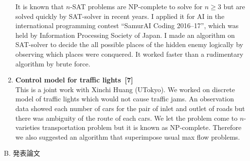 \begin{enumerate}
  It is known that $n$-SAT problems are NP-complete
  to solve for $n \geq 3$
  but are solved quickly by SAT-solver in recent years.
  I applied it for AI in the international
  programming contest ``SamurAI Coding
  2016--17'', which was held by Information
  Processing Society of Japan. I made an algorithm on SAT-solver
  to decide the all possible places of the hidden enemy logically
  by observing which places were conquered.
  It worked faster than a rudimentary algorithm by brute force.
  \item {\bf Control model for traffic lights~[7]} \\
  This is a joint work with Xinchi Huang (UTokyo).
  We worked on discrete model of traffic lights which would not
  cause traffic jams.
  An observation data showed each number of cars for the pair of
  inlet and outlet of roads but there was ambiguity of
  the route of each cars.
  We let the problem come to
  $n$-varieties transportation problem but it is known as
  NP-complete. Therefore we also suggested an algorithm
  that superimpose usual max flow problems.
\end{enumerate}


\vspace{0.2cm}


\noindent
B. 発表論文

\vspace{0.1cm}


